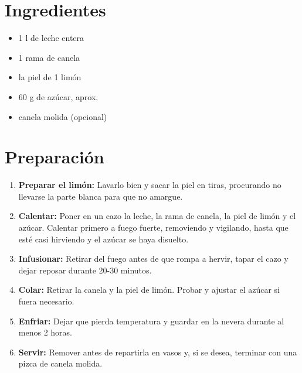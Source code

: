 
    \begin{minipage}[t]{0.35\textwidth}
        \section*{Ingredientes}
        \begin{itemize}[leftmargin=*]
            \item 1 l de leche entera
            \item 1 rama de canela
            \item la piel de 1 limón
            \item 60 g de azúcar, aprox.
            \item canela molida (opcional)
        \end{itemize}
    \end{minipage}
    \hfill
    \begin{minipage}[t]{0.6\textwidth}
        \section*{Preparación}
        \begin{enumerate}
            \item \textbf{Preparar el limón:} Lavarlo bien y sacar la piel en tiras, procurando no llevarse la parte blanca para que no amargue.
            \item \textbf{Calentar:} Poner en un cazo la leche, la rama de canela, la piel de limón y el azúcar. Calentar primero a fuego fuerte, removiendo y vigilando, hasta que esté casi hirviendo y el azúcar se haya disuelto.
            \item \textbf{Infusionar:} Retirar del fuego antes de que rompa a hervir, tapar el cazo y dejar reposar durante 20-30 minutos.
            \item \textbf{Colar:} Retirar la canela y la piel de limón. Probar y ajustar el azúcar si fuera necesario.
            \item \textbf{Enfriar:} Dejar que pierda temperatura y guardar en la nevera durante al menos 2 horas.
            \item \textbf{Servir:} Remover antes de repartirla en vasos y, si se desea, terminar con una pizca de canela molida.
        \end{enumerate}
    \end{minipage}

